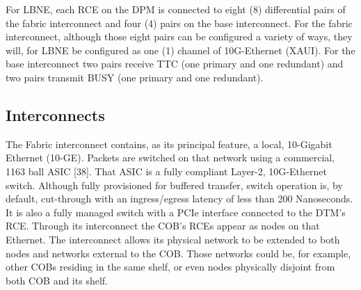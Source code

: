 For LBNE, each RCE on the DPM is connected to eight (8) differential pairs of the fabric interconnect and four (4) pairs on the base interconnect. For the fabric interconnect, although those eight pairs can be configured a variety of ways, they will, for LBNE be configured as one (1) channel of 10G-Ethernet (XAUI). For the base interconnect two pairs receive TTC (one primary and one redundant) and two pairs transmit BUSY (one primary and one redundant).

\subsection{Interconnects}
\label{sec:Interconnects}
The Fabric interconnect contains, as its principal feature, a local, 10-Gigabit Ethernet (10-GE). Packets are switched on that network using a commercial, 1163 ball ASIC [38]. That ASIC is a fully compliant Layer-2, 10G-Ethernet switch. Although fully provisioned for buffered transfer, switch operation is, by default, cut-through with an ingress/egress latency of less than 200 Nanoseconds. It is also a fully managed switch with a PCIe interface connected to the DTM's RCE. Through its interconnect the COB's RCEs appear as nodes on that Ethernet. The interconnect allows its physical network to be extended to both nodes and networks external to the COB. Those networks could be, for example, other COBs residing in the same shelf, or even nodes physically disjoint from both COB and its shelf.

